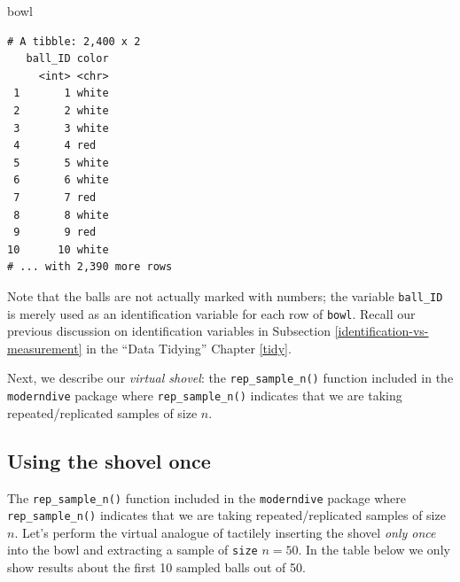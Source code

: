 \documentclass[12pt,]{krantz}
\makeatletter
\newenvironment{Shaded}{\begin{snugshade}}{\end{snugshade}}
\newcommand{\KeywordTok}[1]{\textcolor[rgb]{0.27,0.27,0.27}{\textbf{#1}}}
\newcommand{\DataTypeTok}[1]{\textcolor[rgb]{0.27,0.27,0.27}{#1}}
\newcommand{\DecValTok}[1]{\textcolor[rgb]{0.06,0.06,0.06}{#1}}
\newcommand{\StringTok}[1]{\textcolor[rgb]{0.5,0.5,0.5}{#1}}
\newcommand{\OperatorTok}[1]{\textcolor[rgb]{0.43,0.43,0.43}{\textbf{#1}}}
\newcommand{\NormalTok}[1]{#1}
\newenvironment{kframe}{%
\medskip{}
\setlength{\fboxsep}{.8em}
 \def\at@end@of@kframe{}%
 \ifinner\ifhmode%
  \def\at@end@of@kframe{\end{minipage}}%
  \begin{minipage}{\columnwidth}%
 \fi\fi%
 \def\FrameCommand##1{\hskip\@totalleftmargin \hskip-\fboxsep
 \colorbox{shadecolor}{##1}\hskip-\fboxsep
     \hskip-\linewidth \hskip-\@totalleftmargin \hskip\columnwidth}%
 \MakeFramed {\advance\hsize-\width
   \@totalleftmargin\z@ \linewidth\hsize
   \@setminipage}}%
 {\par\unskip\endMakeFramed%
 \at@end@of@kframe}
\renewenvironment{Shaded}{\begin{kframe}}{\end{kframe}}
\theoremstyle{definition}
\theoremstyle{definition}
\theoremstyle{definition}
\theoremstyle{remark}
\makeatother
\begin{document}
\begin{Shaded}
\begin{Highlighting}[]
\NormalTok{bowl}
\end{Highlighting}
\end{Shaded}

\begin{verbatim}
# A tibble: 2,400 x 2
   ball_ID color
     <int> <chr>
 1       1 white
 2       2 white
 3       3 white
 4       4 red  
 5       5 white
 6       6 white
 7       7 red  
 8       8 white
 9       9 red  
10      10 white
# ... with 2,390 more rows
\end{verbatim}

Note that the balls are not actually marked with numbers; the variable
\texttt{ball\_ID} is merely used as an identification variable for each
row of \texttt{bowl}. Recall our previous discussion on identification
variables in Subsection \ref{identification-vs-measurement} in the
``Data Tidying'' Chapter \ref{tidy}.

Next, we describe our \emph{virtual shovel}: the
\texttt{rep\_sample\_n()} function included in the \texttt{moderndive}
package where \texttt{rep\_sample\_n()} indicates that we are taking
repeated/replicated samples of size \(n\).

\subsection{Using the shovel once}\label{using-the-shovel-once-1}

The \texttt{rep\_sample\_n()} function included in the
\texttt{moderndive} package where \texttt{rep\_sample\_n()} indicates
that we are taking repeated/replicated samples of size \(n\). Let's
perform the virtual analogue of tactilely inserting the shovel
\emph{only once} into the bowl and extracting a sample of \texttt{size}
\(n=50\). In the table below we only show results about the first 10
sampled balls out of 50.

\begin{Shaded}
\end{Shaded}
\end{document}
